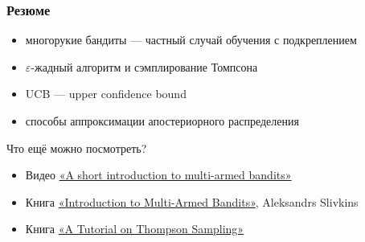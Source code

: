 \documentclass[fullscreen=true, bookmarks=true, hyperref={pdfencoding=unicode}]{beamer}
\begin{document}
\begin{frame}[t]
  \frametitle{Резюме}

  \begin{itemize}
    \item многорукие бандиты — частный случай обучения с подкреплением
    \item $\varepsilon$-жадный алгоритм и сэмплирование Томпсона
    \item UCB — upper confidence bound
    \item способы аппроксимации апостериорного распределения
  \end{itemize}
  \vspace{1cm}
  \pause
  Что ещё можно посмотреть?

  \begin{itemize}
    \item Видео \href{https://www.youtube.com/watch?v=SfSqLn0j10g}{«A short introduction to multi-armed bandits»}
    \item Книга \href{https://arxiv.org/abs/1904.07272}{«Introduction to Multi-Armed Bandits»}, Aleksandrs Slivkins
    \item Книга \href{https://arxiv.org/pdf/1707.02038.pdf}{«A Tutorial on Thompson Sampling»}
  \end{itemize}
\end{frame}
\end{document}
